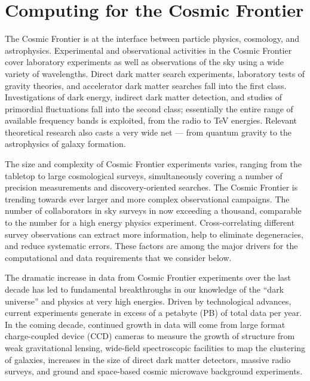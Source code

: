  
\section{Computing for the Cosmic Frontier}


The Cosmic Frontier is at the interface
between particle physics, cosmology, and astrophysics. 
Experimental and observational activities in the Cosmic Frontier cover
laboratory experiments as well as 
observations of the sky using a wide variety of wavelengths.
Direct dark matter search experiments,
laboratory tests of gravity theories, and accelerator dark matter
searches fall into the first class. Investigations of dark energy,
indirect dark matter detection, and studies of primordial fluctuations
fall into the second class; essentially the entire range of available
frequency bands is exploited, from the radio to TeV energies. Relevant
theoretical research also casts a very wide net --- from quantum
gravity to the astrophysics of galaxy formation.

The size and complexity of Cosmic Frontier experiments varies,
ranging from the tabletop to large cosmological surveys,
simultaneously covering a number of precision measurements and
discovery-oriented searches. %
The Cosmic Frontier 
is trending towards ever larger and more complex observational
campaigns. 
The number of collaborators in sky surveys in now exceeding a
thousand, comparable to the number for a high
energy physics experiment. Cross-correlating different survey
observations can extract more information, help to eliminate
degeneracies, and reduce systematic errors. These factors are among
the major drivers for the computational and data requirements that we
consider below.


The dramatic increase in data from Cosmic Frontier experiments over
the last decade has led to fundamental breakthroughs in our knowledge
of the ``dark universe'' and physics at very high energies. Driven by
technological advances, current experiments generate in excess of a
petabyte (PB) of total data per year. 
In the coming decade, continued growth in data will come from
large format 
charge-coupled device (CCD) cameras to measure
the growth of structure from weak gravitational lensing, wide-field
spectroscopic facilities to map the clustering of galaxies, increases
in the size of direct dark matter detectors, massive radio surveys,
and ground and space-based cosmic microwave background 
experiments.


